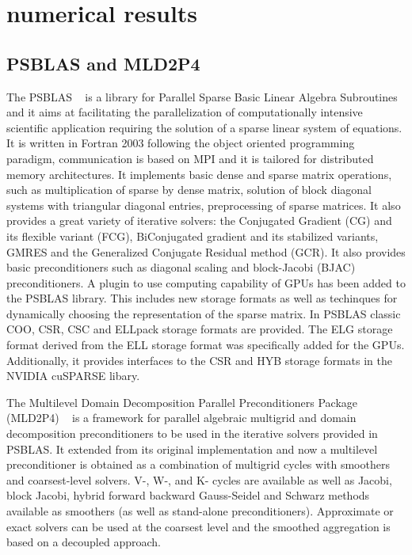 \documentclass[conference]{IEEEtran}
\begin{document}
\section{numerical results}

\subsection{PSBLAS and MLD2P4}
The PSBLAS ~\cite{PSBLAS} is a library for Parallel Sparse Basic Linear Algebra Subroutines and it aims at facilitating the parallelization of computationally intensive scientific application requiring the solution of a sparse linear system of equations. 
It is written in Fortran 2003 following the object oriented programming paradigm, communication is based on MPI and it is tailored for distributed memory architectures. It implements basic dense and sparse matrix operations, such as multiplication of sparse by dense matrix, solution of block diagonal systems with triangular diagonal entries, preprocessing of sparse matrices. It also provides a great variety of iterative solvers: the Conjugated Gradient (CG) and its flexible variant (FCG), BiConjugated gradient and its stabilized variants, GMRES and the Generalized Conjugate Residual method (GCR). It also provides basic preconditioners such as diagonal scaling and block-Jacobi (BJAC) preconditioners. 
A plugin to use computing capability of GPUs has been added to the PSBLAS library. This includes new storage formats as well as techinques for dynamically choosing the representation of the sparse matrix.  
In PSBLAS classic COO, CSR, CSC and ELLpack storage formats are provided. The ELG storage format derived from the ELL storage format was specifically added for the GPUs. 
Additionally, it provides interfaces to the CSR and HYB storage formats in the NVIDIA cuSPARSE libary. 

The Multilevel Domain Decomposition Parallel Preconditioners Package (MLD2P4) ~\cite{mld-toms} is a framework for parallel algebraic multigrid and domain decomposition preconditioners to be used in the iterative solvers provided in PSBLAS. It extended from its original implementation and now a multilevel preconditioner is obtained as a combination of multigrid cycles with smoothers and coarsest-level solvers. V-, W-, and K- cycles \cite{briggs2000multigrid} are available as well as Jacobi, block Jacobi, hybrid forward backward Gauss-Seidel and Schwarz methods available as smoothers (as well as stand-alone preconditioners). Approximate or exact solvers can be used at the coarsest level and the smoothed aggregation is based on a decoupled approach.
 
\end{document}
